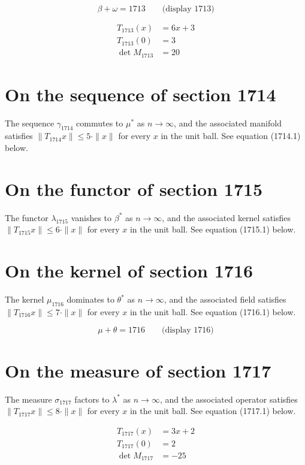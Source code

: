 \documentclass{article}
\begin{document}
$$
\beta + \omega = 1713 \qquad \text{(display 1713)}
$$

\begin{align}
T_{1713}(x) &= 6 x + 3 \\
T_{1713}(0) &= 3 \\
\det M_{1713} &= 20
\end{align}

\section{On the sequence of section 1714}
The sequence $\gamma_{1714}$ commutes to $\mu^{*}$ as $n \to \infty$,
and the associated manifold satisfies $\|T_{1714} x\| \leq 5 \cdot \|x\|$
for every $x$ in the unit ball. See equation (1714.1) below.

\section{On the functor of section 1715}
The functor $\lambda_{1715}$ vanishes to $\beta^{*}$ as $n \to \infty$,
and the associated kernel satisfies $\|T_{1715} x\| \leq 6 \cdot \|x\|$
for every $x$ in the unit ball. See equation (1715.1) below.

\section{On the kernel of section 1716}
The kernel $\mu_{1716}$ dominates to $\theta^{*}$ as $n \to \infty$,
and the associated field satisfies $\|T_{1716} x\| \leq 7 \cdot \|x\|$
for every $x$ in the unit ball. See equation (1716.1) below.

$$
\mu + \theta = 1716 \qquad \text{(display 1716)}
$$

\section{On the measure of section 1717}
The measure $\sigma_{1717}$ factors to $\lambda^{*}$ as $n \to \infty$,
and the associated operator satisfies $\|T_{1717} x\| \leq 8 \cdot \|x\|$
for every $x$ in the unit ball. See equation (1717.1) below.

\begin{align}
T_{1717}(x) &= 3 x + 2 \\
T_{1717}(0) &= 2 \\
\det M_{1717} &= -25
\end{align}
\end{document}
